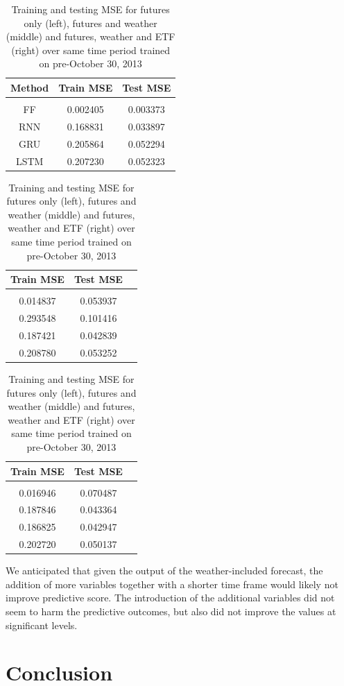\documentclass[twoside,11pt]{article}
\begin{document}
\begin{table}[h!]
		\begin{tabular}{ccc}
			Method & Train MSE & Test MSE \\
			\hline \\[-11pt]
			FF& 0.002405 & 0.003373 \\
			RNN & 0.168831 & 0.033897 \\ 
			GRU & 0.205864 & 0.052294 \\
			LSTM & 0.207230 & 0.052323 \\
			\hline
		\end{tabular}
	\vline
		\begin{tabular}{ccc}
			Train MSE & Test MSE \\
			\hline \\[-11pt]
			0.014837 & 0.053937 \\
			0.293548 & 0.101416 \\ 
			0.187421 & 0.042839 \\
			0.208780 & 0.053252 \\
			\hline
		\end{tabular}
		\vline
			\begin{tabular}{ccc}
		Train MSE & Test MSE \\
		\hline \\[-11pt]
		0.016946 & 0.070487 \\
		0.187846 & 0.043364 \\ 
		0.186825 & 0.042947 \\
		0.202720 & 0.050137 \\
		\hline
	\end{tabular}
		
		\caption{Training and testing MSE for futures only (left), futures and weather (middle) and futures, weather and ETF (right) over same time period trained on pre-October 30, 2013}\label{tab:futuresweatherandetf}
\end{table}

We anticipated that given the output of the weather-included forecast, the addition of more variables together with a shorter time frame would likely not improve predictive score. The introduction of the additional variables did not seem to harm the predictive outcomes, but also did not improve the values at significant levels. 

\section{Conclusion}
\end{document}
